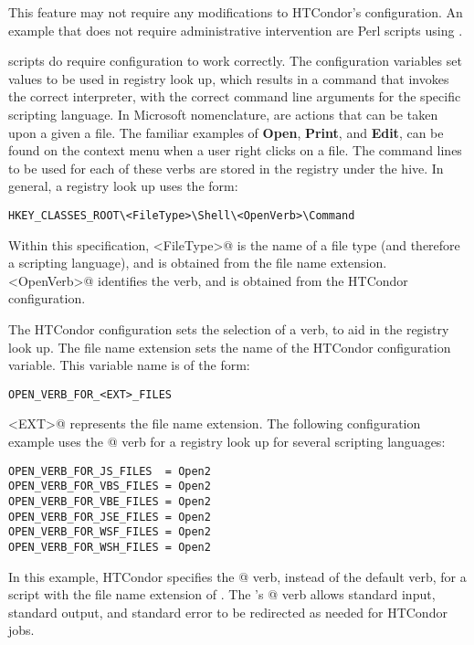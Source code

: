This feature may not require any modifications to HTCondor's configuration.  
An example that does not require administrative intervention
are Perl scripts using .

 scripts do require
configuration to work correctly.
The configuration variables set values to be used in registry look up,
which results in a command that invokes the correct interpreter,
with the correct command line arguments for the specific scripting
language.
In Microsoft nomenclature, 
 are actions that can be taken upon a given a file.
The familiar examples of
\textbf{Open}, \textbf{Print}, and \textbf{Edit},
can be found on the context menu when a user right clicks on a file.
The command lines to be used for each of these verbs are stored in
the registry under the  hive.
In general, a registry look up uses the form:

\footnotesize
\begin{verbatim}
HKEY_CLASSES_ROOT\<FileType>\Shell\<OpenVerb>\Command
\end{verbatim}
\normalsize

Within this specification, 
\verb@<FileType>@ is the name of a file type
(and therefore a scripting language),
and is obtained from the file name extension.
\verb@<OpenVerb>@ identifies the verb,
and is obtained from the HTCondor configuration.

The HTCondor configuration sets the selection of a verb,
to aid in the registry look up.
The file name extension sets the name of the HTCondor configuration variable.
This variable name is of the form:
\begin{verbatim}
OPEN_VERB_FOR_<EXT>_FILES
\end{verbatim}
\verb@<EXT>@ represents the file name extension.
The following configuration example uses the @ verb for
a  registry look up for several scripting
languages:

\begin{verbatim}
OPEN_VERB_FOR_JS_FILES  = Open2
OPEN_VERB_FOR_VBS_FILES = Open2
OPEN_VERB_FOR_VBE_FILES = Open2
OPEN_VERB_FOR_JSE_FILES = Open2
OPEN_VERB_FOR_WSF_FILES = Open2
OPEN_VERB_FOR_WSH_FILES = Open2
\end{verbatim}

In this example, HTCondor specifies the @ verb,
instead of the default \verb@Open@ verb,
for a script with the file name extension of \verb@wsh@.
The 's @ verb allows standard input,
standard output, and standard error to be redirected
as needed for HTCondor jobs.

